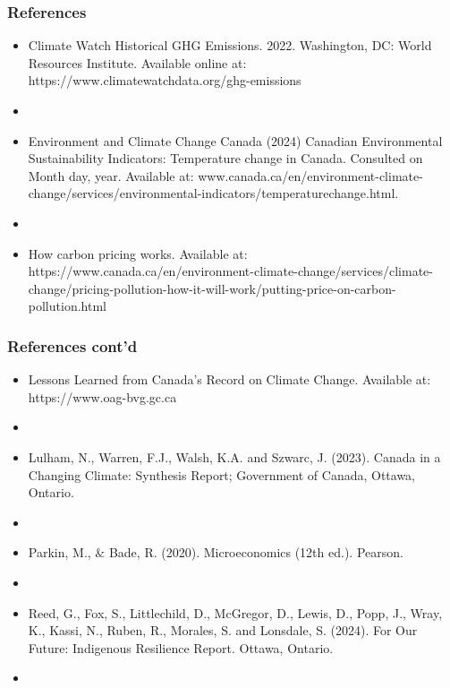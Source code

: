 \documentclass[blue]{beamer}
\begin{document}
 \begin{frame} \frametitle{References}
\label{References}
\begin{itemize}
 \item Climate Watch Historical GHG Emissions. 2022. Washington, DC: World Resources Institute. Available online at: https://www.climatewatchdata.org/ghg-emissions
 \item[]
 \item Environment and Climate Change Canada (2024) Canadian Environmental Sustainability Indicators: Temperature change in Canada. Consulted on Month day, year.  Available at: www.canada.ca/en/environment-climate-change/services/environmental-indicators/temperaturechange.html. 
 \item[]

 \item How carbon pricing works. Available at: https://www.canada.ca/en/environment-climate-change/services/climate-change/pricing-pollution-how-it-will-work/putting-price-on-carbon-pollution.html
 

 
\end{itemize}
 \end{frame}


 \begin{frame} \frametitle{References cont'd}
\label{References}
\begin{itemize}
 \item Lessons Learned from Canada's Record on Climate Change.  Available at: https://www.oag-bvg.gc.ca
 \item[]
\item Lulham, N., Warren, F.J., Walsh, K.A. and Szwarc, J. (2023). Canada in a Changing Climate: Synthesis Report; Government of Canada, Ottawa, Ontario.
\item[]
\item Parkin, M.,  $\&$ Bade, R. (2020). Microeconomics (12th ed.). Pearson.
\item[]
\item Reed, G., Fox, S., Littlechild, D., McGregor, D., Lewis, D., Popp, J., Wray, K., Kassi, N., Ruben, R., Morales, S. and Lonsdale, S. (2024). For Our Future: Indigenous Resilience Report. Ottawa, Ontario.
\item[]

\end{itemize}
 \end{frame}
\end{document}

